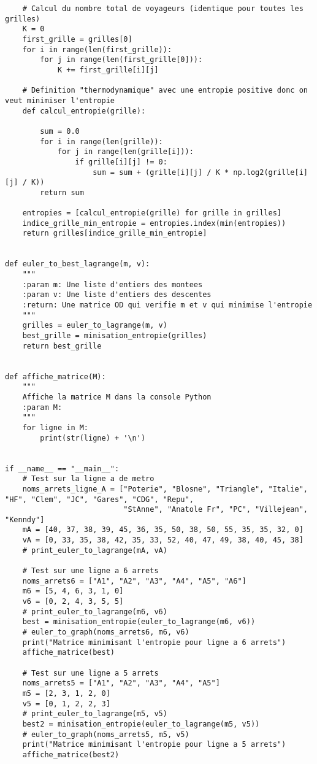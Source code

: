 \documentclass[12pt]{article}
\begin{document}
\begin{lstlisting}
    # Calcul du nombre total de voyageurs (identique pour toutes les grilles)
    K = 0
    first_grille = grilles[0]
    for i in range(len(first_grille)):
        for j in range(len(first_grille[0])):
            K += first_grille[i][j]

    # Definition "thermodynamique" avec une entropie positive donc on veut minimiser l'entropie
    def calcul_entropie(grille):

        sum = 0.0
        for i in range(len(grille)):
            for j in range(len(grille[i])):
                if grille[i][j] != 0:
                    sum = sum + (grille[i][j] / K * np.log2(grille[i][j] / K))
        return sum

    entropies = [calcul_entropie(grille) for grille in grilles]
    indice_grille_min_entropie = entropies.index(min(entropies))
    return grilles[indice_grille_min_entropie]


def euler_to_best_lagrange(m, v):
    """
    :param m: Une liste d'entiers des montees
    :param v: Une liste d'entiers des descentes
    :return: Une matrice OD qui verifie m et v qui minimise l'entropie
    """
    grilles = euler_to_lagrange(m, v)
    best_grille = minisation_entropie(grilles)
    return best_grille


def affiche_matrice(M):
    """
    Affiche la matrice M dans la console Python
    :param M:
    """
    for ligne in M:
        print(str(ligne) + '\n')


if __name__ == "__main__":
    # Test sur la ligne a de metro
    noms_arrets_ligne_A = ["Poterie", "Blosne", "Triangle", "Italie", "HF", "Clem", "JC", "Gares", "CDG", "Repu",
                           "StAnne", "Anatole Fr", "PC", "Villejean", "Kenndy"]
    mA = [40, 37, 38, 39, 45, 36, 35, 50, 38, 50, 55, 35, 35, 32, 0]
    vA = [0, 33, 35, 38, 42, 35, 33, 52, 40, 47, 49, 38, 40, 45, 38]
    # print_euler_to_lagrange(mA, vA)

    # Test sur une ligne a 6 arrets
    noms_arrets6 = ["A1", "A2", "A3", "A4", "A5", "A6"]
    m6 = [5, 4, 6, 3, 1, 0]
    v6 = [0, 2, 4, 3, 5, 5]
    # print_euler_to_lagrange(m6, v6)
    best = minisation_entropie(euler_to_lagrange(m6, v6))
    # euler_to_graph(noms_arrets6, m6, v6)
    print("Matrice minimisant l'entropie pour ligne a 6 arrets")
    affiche_matrice(best)

    # Test sur une ligne a 5 arrets
    noms_arrets5 = ["A1", "A2", "A3", "A4", "A5"]
    m5 = [2, 3, 1, 2, 0]
    v5 = [0, 1, 2, 2, 3]
    # print_euler_to_lagrange(m5, v5)
    best2 = minisation_entropie(euler_to_lagrange(m5, v5))
    # euler_to_graph(noms_arrets5, m5, v5)
    print("Matrice minimisant l'entropie pour ligne a 5 arrets")
    affiche_matrice(best2)
\end{lstlisting}
\end{document}
